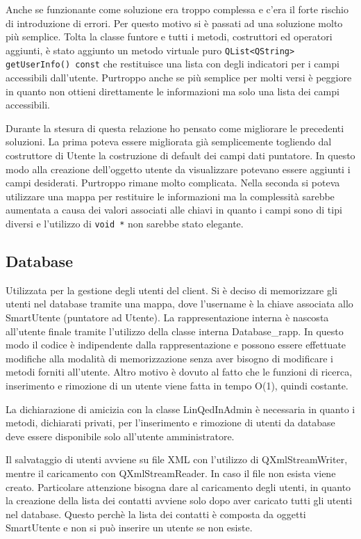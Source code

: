 \documentclass[a4paper]{article}
\begin{document}
Anche se funzionante come soluzione era troppo complessa e c'era il forte rischio di introduzione di errori. Per questo motivo si è passati ad una soluzione molto più semplice. Tolta la classe funtore e tutti i metodi, costruttori ed operatori aggiunti, è stato aggiunto un metodo virtuale puro \texttt{QList<QString> getUserInfo() const} che restituisce una lista con degli indicatori per i campi accessibili dall'utente. Purtroppo anche se più semplice per molti versi è peggiore in quanto non ottieni direttamente le informazioni ma solo una lista dei campi accessibili.

Durante la stesura di questa relazione ho pensato come migliorare le precedenti soluzioni. La prima poteva essere migliorata già semplicemente togliendo dal costruttore di Utente la costruzione di default dei campi dati puntatore. In questo modo alla creazione dell'oggetto utente da visualizzare potevano essere aggiunti i campi desiderati. Purtroppo rimane molto complicata. Nella seconda si poteva utilizzare una mappa per restituire le informazioni ma la complessità sarebbe aumentata a causa dei valori associati alle chiavi in quanto i campi sono di tipi diversi e l'utilizzo di \texttt{void *} non sarebbe stato elegante.

\subsection*{Database}
Utilizzata per la gestione degli utenti del client. Si è deciso di memorizzare gli utenti nel database tramite una mappa, dove l'username è la chiave associata allo SmartUtente (puntatore ad Utente). La rappresentazione interna è nascosta all'utente finale tramite l'utilizzo della classe interna Database\_rapp. In questo modo il codice è indipendente dalla rappresentazione e possono essere effettuate modifiche alla modalità di memorizzazione senza aver bisogno di modificare i metodi forniti all'utente. Altro motivo è dovuto al fatto che le funzioni di ricerca, inserimento e rimozione di un utente viene fatta in tempo O(1), quindi costante.

La dichiarazione di amicizia con la classe LinQedInAdmin è necessaria in quanto i metodi, dichiarati privati, per l'inserimento e rimozione di utenti da database deve essere disponibile solo all'utente amministratore.

Il salvataggio di utenti avviene su file XML con l'utilizzo di QXmlStreamWriter, mentre il caricamento con QXmlStreamReader. In caso il file non esista viene creato. Particolare attenzione bisogna dare al caricamento degli utenti, in quanto la creazione della lista dei contatti avviene solo dopo aver caricato tutti gli utenti nel database. Questo perchè la lista dei contatti è composta da oggetti SmartUtente e non si può inserire un utente se non esiste.
\end{document}
